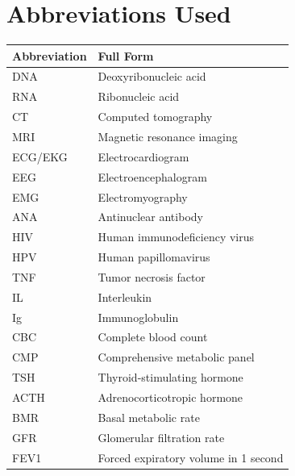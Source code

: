 \documentclass[12pt,a4paper,twoside]{book}
\begin{document}
\backmatter

\chapter*{Abbreviations Used}
\noindent
\begin{tabularx}{\textwidth}{lX}
\toprule
\textbf{Abbreviation} & \textbf{Full Form} \\
\midrule
DNA  & Deoxyribonucleic acid \\
RNA  & Ribonucleic acid \\
CT   & Computed tomography \\
MRI  & Magnetic resonance imaging \\
ECG/EKG & Electrocardiogram \\
EEG  & Electroencephalogram \\
EMG  & Electromyography \\
ANA  & Antinuclear antibody \\
HIV  & Human immunodeficiency virus \\
HPV  & Human papillomavirus \\
TNF  & Tumor necrosis factor \\
IL   & Interleukin \\
Ig   & Immunoglobulin \\
CBC  & Complete blood count \\
CMP  & Comprehensive metabolic panel \\
TSH  & Thyroid-stimulating hormone \\
ACTH & Adrenocorticotropic hormone \\
BMR  & Basal metabolic rate \\
GFR  & Glomerular filtration rate \\
FEV1 & Forced expiratory volume in 1 second \\
\bottomrule
\end{tabularx}
\end{document}
